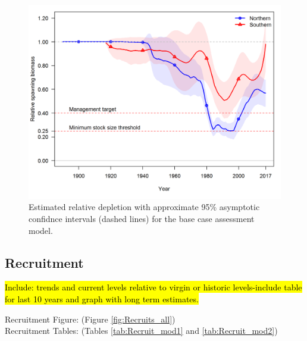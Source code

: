 \documentclass[12pt,]{article}
\begin{document}
\begin{figure}[htbp]
\centering
\includegraphics{r4ss/plots_compare/base_compare4_Bratio_uncertainty.png}
\caption{Estimated relative depletion with approximate 95\% asymptotic
confidnce intervals (dashed lines) for the base case assessment model.
\label{fig:RelDeplete_all}}
\end{figure}

\FloatBarrier

\subsection*{Recruitment}\label{recruitment}

\hl{Include: trends and current levels relative to virgin or historic levels-include 
table for last 10 years and graph with long term estimates.}

Recruitment Figure: (Figure \ref{fig:Recruits_all})\\
Recruitment Tables: (Tables \ref{tab:Recruit_mod1} and
\ref{tab:Recruit_mod2})
\end{document}
